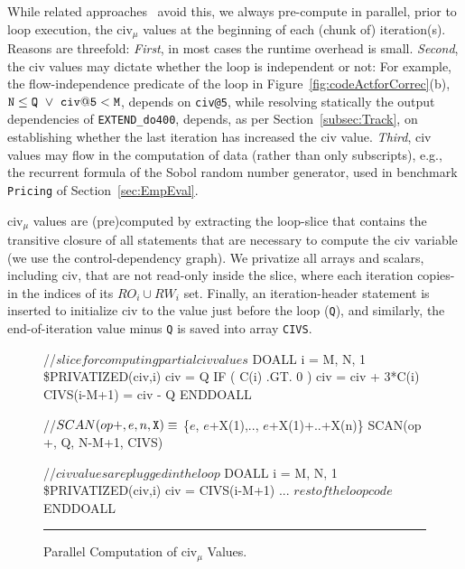 \documentclass{sig-alternate}
\newcommand{\mymath}[1]{$ #1 $}
\begin{document}
While related approaches~\cite{PaduaDemDrInterproc,VEG} avoid this, we always pre-compute in
parallel, prior to loop execution, the {\sc civ}$_\mu$ values at the beginning 
of each (chunk of) iteration(s).
Reasons are threefold: {\em First}, in most cases %
the runtime overhead is small. {\em Second}, the {\sc civ} values may dictate
whether the loop is independent or not: For example,  the flow-independence
predicate of the loop in Figure~\ref{fig:codeActforCorrec}(b), 
${\tt N} \le {\tt Q}~\vee~{\tt civ@5} < {\tt M}$,
depends on {\tt civ@5}, while resolving statically the output 
dependencies of {\tt EXTEND\_do400}, depends, as
per Section~\ref{subsec:Track}, on establishing whether the last
iteration has increased the {\sc civ} value. 
%
{\em Third}, {\sc civ} values may flow in the computation
of data (rather than only subscripts), e.g., the recurrent
formula of the Sobol random number generator, used in
benchmark {\tt Pricing}  of Section~\ref{sec:EmpEval}.

{\sc civ}$_\mu$ values are (pre)computed by extracting the loop-slice
that contains the transitive closure of all statements 
that are necessary to compute the {\sc civ} variable
(we use the control-dependency graph). 
We privatize all arrays and scalars, including {\sc civ}, that are not 
read-only inside the slice, where each iteration copies-in the  indices 
of its $RO_i \cup RW_i$ set. Finally, an iteration-header statement is 
inserted to initialize {\sc civ} to the value just before the loop ({\tt Q}), 
and similarly, the end-of-iteration value minus {\tt Q} is saved into array 
{\tt CIVS}.  


\begin{figure}
\begin{colorcode}
//\mymath{slice for computing partial civ values}
DOALL i = M, N, 1      \$PRIVATIZED(civ,i)
  civ = Q
  IF ( C(i) .GT. 0 ) civ = civ + 3*C(i)
  CIVS(i-M+1) = civ - Q
ENDDOALL

//\mymath{SCAN(op {\tt{}+}, e, n, {\tt{}X}) \equiv} \{\mymath{e}, \mymath{e}+X(1),.., \mymath{e}+X(1)+..+X(n)\}
SCAN(op +, Q, N-M+1, CIVS)

//\mymath{civ values are plugged in the loop} 
DOALL i = M, N, 1      \$PRIVATIZED(civ,i)
  civ = CIVS(i-M+1)
  ... \mymath{rest of the loop code} 
ENDDOALL
\end{colorcode}
\vspace{-1ex}
\hrule
\vspace{-0.5ex}
\caption{ Parallel Computation of {\sc civ}$_\mu$ Values.}
\label{fig:CivSlice} %
\end{figure}
\end{document}
